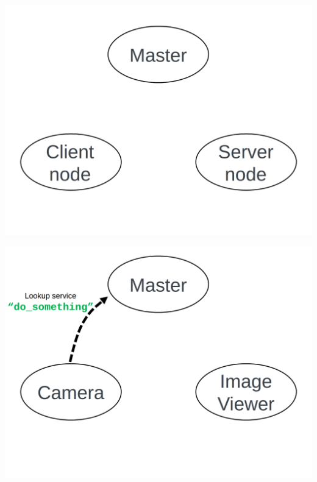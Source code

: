 \documentclass{beamer}
\begin{document}
\begin{frame}[plain]{}
    \centering
    \includegraphics[width =1.0\linewidth]{figures/service1.png}                                                              
\end{frame} 
\begin{frame}[plain]{}
    \centering
    \includegraphics[width =1.0\linewidth]{figures/service3.png}                                                              
\end{frame} 
\end{document}
